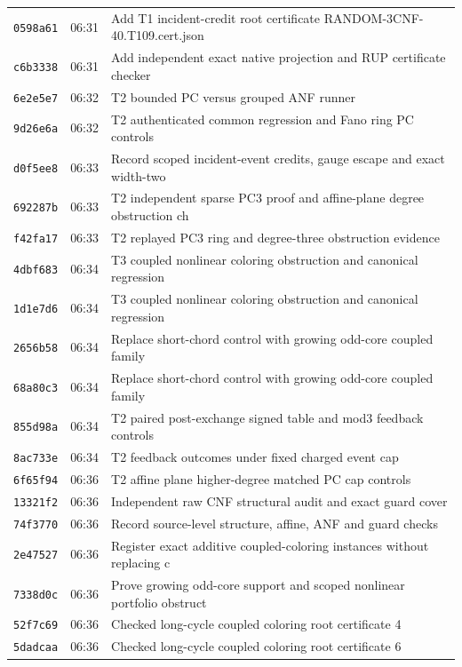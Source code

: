 \documentclass[11pt]{article}
\theoremstyle{definition}
\theoremstyle{remark}
\begin{document}
\begin{longtable}{llp{11.5cm}}
\texttt{0598a61} & 06:31 & Add T1 incident-credit root certificate RANDOM-3CNF-40.T109.cert.json\\
\texttt{c6b3338} & 06:31 & Add independent exact native projection and RUP certificate checker\\
\texttt{6e2e5e7} & 06:32 & T2 bounded PC versus grouped ANF runner\\
\texttt{9d26e6a} & 06:32 & T2 authenticated common regression and Fano ring PC controls\\
\texttt{d0f5ee8} & 06:33 & Record scoped incident-event credits, gauge escape and exact width-two\\
\texttt{692287b} & 06:33 & T2 independent sparse PC3 proof and affine-plane degree obstruction ch\\
\texttt{f42fa17} & 06:33 & T2 replayed PC3 ring and degree-three obstruction evidence\\
\texttt{4dbf683} & 06:34 & T3 coupled nonlinear coloring obstruction and canonical regression\\
\texttt{1d1e7d6} & 06:34 & T3 coupled nonlinear coloring obstruction and canonical regression\\
\texttt{2656b58} & 06:34 & Replace short-chord control with growing odd-core coupled family\\
\texttt{68a80c3} & 06:34 & Replace short-chord control with growing odd-core coupled family\\
\texttt{855d98a} & 06:34 & T2 paired post-exchange signed table and mod3 feedback controls\\
\texttt{8ac733e} & 06:34 & T2 feedback outcomes under fixed charged event cap\\
\texttt{6f65f94} & 06:36 & T2 affine plane higher-degree matched PC cap controls\\
\texttt{13321f2} & 06:36 & Independent raw CNF structural audit and exact guard cover\\
\texttt{74f3770} & 06:36 & Record source-level structure, affine, ANF and guard checks\\
\texttt{2e47527} & 06:36 & Register exact additive coupled-coloring instances without replacing c\\
\texttt{7338d0c} & 06:36 & Prove growing odd-core support and scoped nonlinear portfolio obstruct\\
\texttt{52f7c69} & 06:36 & Checked long-cycle coupled coloring root certificate 4\\
\texttt{5dadcaa} & 06:36 & Checked long-cycle coupled coloring root certificate 6\\

\end{longtable}
\end{document}
